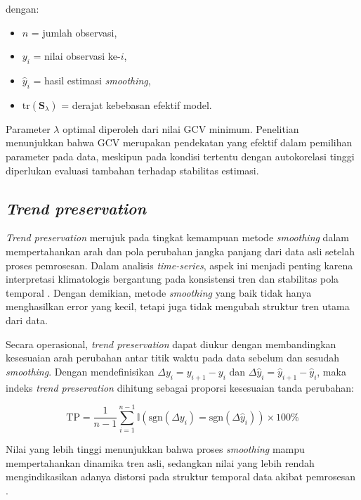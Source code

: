 dengan:
\begin{itemize}
    \item $n$ = jumlah observasi,
    \item $y_i$ = nilai observasi ke-$i$,
    \item $\hat{y}_i$ = hasil estimasi \textit{smoothing},
    \item $\text{tr}(\mathbf{S}_\lambda)$ = derajat kebebasan efektif model.
\end{itemize}

Parameter $\lambda$ optimal diperoleh dari nilai GCV minimum. Penelitian \cite{adams2023} menunjukkan bahwa GCV merupakan pendekatan yang efektif dalam pemilihan parameter pada data, meskipun pada kondisi tertentu dengan autokorelasi tinggi diperlukan evaluasi tambahan terhadap stabilitas estimasi.
\subsection{\textit{Trend preservation}}
\textit{Trend preservation} merujuk pada tingkat kemampuan metode \textit{smoothing} dalam mempertahankan arah dan pola perubahan jangka panjang dari data asli setelah proses pemrosesan. Dalam analisis \textit{time-series}, aspek ini menjadi penting karena interpretasi klimatologis bergantung pada konsistensi tren dan stabilitas pola temporal \citep{chang2024}. Dengan demikian, metode \textit{smoothing} yang baik tidak hanya menghasilkan error yang kecil, tetapi juga tidak mengubah struktur tren utama dari data.

Secara operasional, \textit{trend preservation} dapat diukur dengan membandingkan kesesuaian arah perubahan antar titik waktu pada data sebelum dan sesudah \textit{smoothing}. Dengan mendefinisikan \(\Delta y_i = y_{i+1} - y_i\) dan \(\Delta \hat{y}_i = \hat{y}_{i+1} - \hat{y}_i\), maka indeks \textit{trend preservation} dihitung sebagai proporsi kesesuaian tanda perubahan:

\begin{equation}
\text{TP} = \frac{1}{n-1} \sum_{i=1}^{n-1} \mathbb{I}\left(\text{sgn}(\Delta y_i) = \text{sgn}(\Delta \hat{y}_i)\right) \times 100\%
\end{equation}

Nilai yang lebih tinggi menunjukkan bahwa proses \textit{smoothing} mampu mempertahankan dinamika tren asli, sedangkan nilai yang lebih rendah mengindikasikan adanya distorsi pada struktur temporal data akibat pemrosesan \citep{steinacker2021}.


